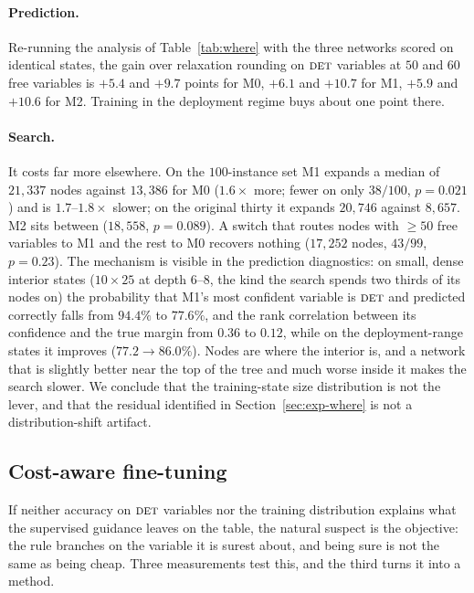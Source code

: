 \documentclass[final,5p,times,twocolumn]{elsarticle}
\newcommand{\FORCED}{\textsc{det}}
\begin{document}
\paragraph{Prediction.} Re-running the analysis of Table~\ref{tab:where} with the three networks scored on identical states, the gain over relaxation rounding on $\FORCED$ variables at $50$ and $60$ free variables is $+5.4$ and $+9.7$ points for \textsc{M0}, $+6.1$ and $+10.7$ for \textsc{M1}, $+5.9$ and $+10.6$ for \textsc{M2}. Training in the deployment regime buys about one point there.

\paragraph{Search.} It costs far more elsewhere. On the $100$-instance set \textsc{M1} expands a median of $21{,}337$ nodes against $13{,}386$ for \textsc{M0} ($1.6\times$ more; fewer on only $38/100$, $p=0.021$) and is $1.7$--$1.8\times$ slower; on the original thirty it expands $20{,}746$ against $8{,}657$. \textsc{M2} sits between ($18{,}558$, $p=0.089$). A switch that routes nodes with $\ge50$ free variables to \textsc{M1} and the rest to \textsc{M0} recovers nothing ($17{,}252$ nodes, $43/99$, $p=0.23$). The mechanism is visible in the prediction diagnostics: on small, dense interior states ($10\times25$ at depth $6$--$8$, the kind the search spends two thirds of its nodes on) the probability that \textsc{M1}'s most confident variable is $\FORCED$ and predicted correctly falls from $94.4\%$ to $77.6\%$, and the rank correlation between its confidence and the true margin from $0.36$ to $0.12$, while on the deployment-range states it improves ($77.2\to86.0\%$). Nodes are where the interior is, and a network that is slightly better near the top of the tree and much worse inside it makes the search slower. We conclude that the training-state size distribution is not the lever, and that the residual identified in Section~\ref{sec:exp-where} is not a distribution-shift artifact.

\subsection{Cost-aware fine-tuning}
\label{sec:exp-rl}

If neither accuracy on $\FORCED$ variables nor the training distribution explains what the supervised guidance leaves on the table, the natural suspect is the objective: the rule branches on the variable it is surest about, and being sure is not the same as being cheap. Three measurements test this, and the third turns it into a method.
\end{document}
